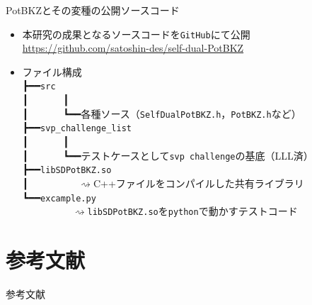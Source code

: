 \documentclass[12pt,aspectratio=169,xcolor=dvipsnames,table,dvipdfmx, leqno]{beamer}
\begin{document}
\begin{frame}{PotBKZとその変種の公開ソースコード}
\begin{itemize}
    \item 本研究の成果となるソースコードを\texttt{GitHub}にて公開\\
    \url{https://github.com/satoshin-des/self-dual-PotBKZ}
    \item ファイル構成\\
    ┣━━\texttt{src}\\
    ┃~~~~~~~┃\\
    ┃~~~~~~~┗━━各種ソース（\texttt{SelfDualPotBKZ.h}，\texttt{PotBKZ.h}など）\\
    ┣━━\texttt{svp\_challenge\_list}\\
    ┃~~~~~~~┃\\
    ┃~~~~~~~┗━━テストケースとして\texttt{svp~challenge}\cite{SVP}の基底（LLL済）\\
    ┣━━\texttt{libSDPotBKZ.so}\\
    ┃~~~~~~~~~~$\rightsquigarrow$C++ファイルをコンパイルした共有ライブラリ\\
    ┗━━\texttt{excample.py}\\
    \quad~~~~~~~~~~$\rightsquigarrow$\texttt{libSDPotBKZ.so}を\texttt{python}で動かすテストコード
\end{itemize}
\end{frame}

\section{参考文献}
\begin{frame}[allowframebreaks]{参考文献}
\beamertemplatetextbibitems


\end{frame}
\end{document}
